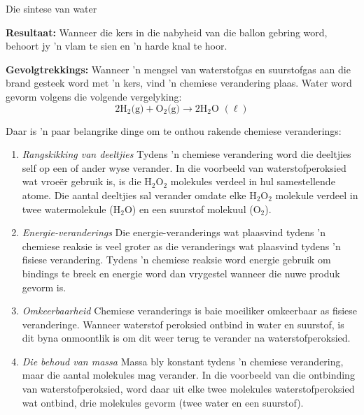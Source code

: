 \begin{g_experiment}{Die sintese van water}
        \par 
        \label{m38709*id63254}\noindent{}\textbf{Resultaat:}\newline
Wanneer die kers in die nabyheid van die ballon gebring word, behoort jy 'n vlam te sien en 'n harde knal te hoor.\par 
        \label{m38709*id63302}\noindent{}\textbf{Gevolgtrekkings:}\newline
Wanneer 'n mengsel van waterstofgas en suurstofgas aan die brand gesteek word met 'n kers, vind 'n chemiese verandering plaas. Water word gevorm volgens die volgende vergelyking:
        \label{m38709*id63313}\nopagebreak\noindent{}
    \begin{equation*}
    2{\text{H}}_{2} \text{(g)} + {\text{O}}_{2}\text{(g)} \to 2\text{H}_{2}\text{O } (\ell)
      \end{equation*}   
\end{g_experiment}
      \label{m38709*id62865} Daar is 'n paar belangrike dinge om te onthou rakende chemiese veranderings:\par 
      \label{m38709*id62869}\begin{enumerate}[noitemsep, label=\textbf{\arabic*}. ] 
            \label{m38709*uid6}\item \textsl{Rangskikking van deeltjies}\newline
Tydens 'n chemiese verandering word die deeltjies self op een of ander wyse verander. In die voorbeeld van waterstofperoksied wat vroe\"{e}r gebruik is, is die $\text{H}_{2}\text{O}_{2}$ molekules verdeel in hul samestellende atome. Die aantal deeltjies sal verander omdate elke $\text{H}_{2}\text{O}_{2}$ molekule verdeel in twee watermolekule ($\text{H}_{2}\text{O}$) en een suurstof molekuul ($\text{O}_{2}$).
\label{m38709*uid7}\item \textsl{Energie-veranderings}\newline
Die energie-veranderings wat plaasvind tydens 'n chemiese reaksie is veel groter as die veranderings wat plaasvind tydens 'n fisiese verandering. Tydens 'n chemiese reaksie word energie gebruik om bindings te breek en energie word dan vrygestel wanneer die nuwe produk gevorm is. 
\label{m38709*uid8}\item \textsl{Omkeerbaarheid}\newline
Chemiese veranderings is baie moeiliker omkeerbaar as fisiese veranderinge. Wanneer waterstof peroksied ontbind in water en suurstof, is dit byna onmoontlik is om dit weer terug te verander na waterstofperoksied.
\item \textsl{Die behoud van massa}\newline
Massa bly konstant tydens 'n chemiese verandering, maar die aantal molekules mag verander. In die voorbeeld van die ontbinding van waterstofperoksied, word daar uit elke twee molekules waterstofperoksied wat ontbind, drie molekules gevorm (twee water en een suurstof).
\end{enumerate}
